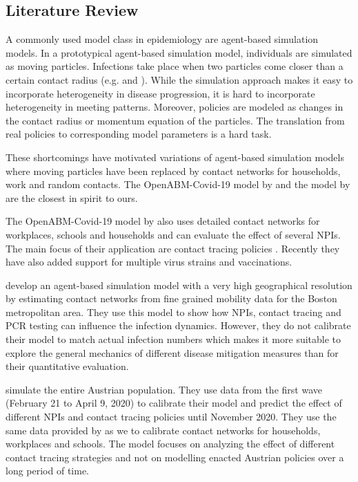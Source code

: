 \subsection{Literature Review}
\label{sec:literature_review}

A commonly used model class in epidemiology are agent-based simulation models. In a
prototypical agent-based simulation model, individuals are simulated as moving
particles. Infections take place when two particles come closer than a certain contact
radius (e.g. \citet{Silva2020} and \citet{Cuevas2020}). While the simulation approach
makes it easy to incorporate heterogeneity in disease progression, it is hard to
incorporate heterogeneity in meeting patterns. Moreover, policies are modeled as changes
in the contact radius or momentum equation of the particles. The translation from real
policies to corresponding model parameters is a hard task.

These shortcomings have motivated variations of agent-based simulation models where
moving particles have been replaced by contact networks for households, work and random
contacts. The OpenABM-Covid-19 model by \citet{Hinch2021a} and the model by
\citet{Aleta2020} are the closest in spirit to ours.

The OpenABM-Covid-19 model by \citet{Hinch2021a} also uses detailed contact networks for
workplaces, schools and households and can evaluate the effect of several NPIs. The main
focus of their application are contact tracing policies \citep{Abueg2021}. Recently they
have also added support for multiple virus strains and vaccinations.

\citet{Aleta2020} develop an agent-based simulation model with a very high geographical
resolution by estimating contact networks from fine grained mobility data for the Boston
metropolitan area. They use this model to show how NPIs, contact tracing and PCR testing
can influence the infection dynamics. However, they do not calibrate their model to
match actual infection numbers which makes it more suitable to explore the general
mechanics of different disease mitigation measures than for their quantitative
evaluation.

\citet{Bicher2021} simulate the entire Austrian population. They use data from the first
wave (February 21 to April 9, 2020) to calibrate their model and predict the effect of
different NPIs and contact tracing policies until November 2020. They use the same data
provided by \citet{Mossong2008} as we to calibrate contact networks for households,
workplaces and schools. The model focuses on analyzing the effect of different contact
tracing strategies and not on modelling enacted Austrian policies over a long period of
time.

